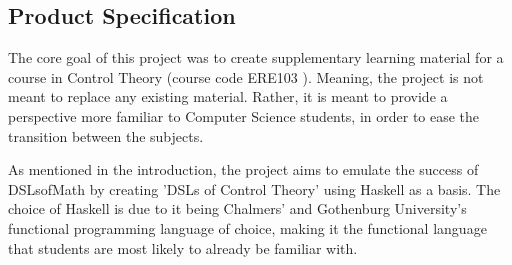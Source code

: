 \subsection{Product Specification}

\iffalse
produkt - 
kontinuerligt rapportera processen
kontakt med examinator
be studenter som gått/går kursen att ge respons
skriva en "bok" i latex
ev göra om boken till en hemsida

hur ska vi testa det?
prata med folk somh har läst kursen innan 

rapport - 


Känns som vi bör diskutera metod mer på nästa möte.
\fi

\iffalse
Metod/Genomförande
Hur gruppen tänkt sig att genomföra arbetet Olika deluppgifter/delstudier kräver ofta separata metodavsnitt.

Metodbeskrivningen förankras vanligen i metodlitteratur. 

Detta är typiskt ett avsnitt som uppdateras under arbetets gång
\fi




The core goal of this project was to create supplementary learning material for a course in Control Theory (course code ERE103 \cite{ERE103}). Meaning, the project is not meant to replace any existing material. Rather, it is meant to provide a perspective more familiar to Computer Science students, in order to ease the transition between the subjects.



As mentioned in the introduction, the project aims to emulate the success of DSLsofMath \cite{DAT326} by creating 'DSLs of Control Theory' using Haskell as a basis. The choice of Haskell is due to it being Chalmers' and Gothenburg University's functional programming language of choice, making it the functional language that students are most likely to already be familiar with.

